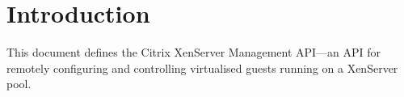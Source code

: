 \documentclass{report}
\begin{document}


\tableofcontents


\chapter{Introduction}

This document defines the Citrix XenServer Management API---an API for
remotely configuring and controlling virtualised guests running on a
XenServer pool.

~






\end{document}
